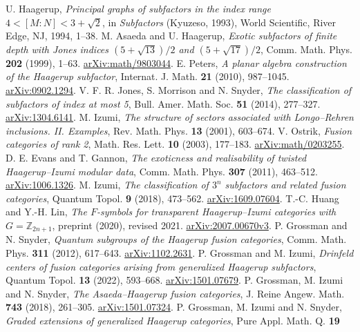 U. Haagerup, \emph{Principal graphs of subfactors in the index range
$4<[M:N]<3+\sqrt2$}, in \emph{Subfactors} (Kyuzeso, 1993), World
Scientific, River Edge, NJ, 1994, 1--38.
M. Asaeda and U. Haagerup, \emph{Exotic subfactors of finite depth with
Jones indices $(5+\sqrt{13})/2$ and $(5+\sqrt{17})/2$}, Comm. Math.
Phys. \textbf{202} (1999), 1--63.
\href{https://arxiv.org/abs/math/9803044}{arXiv:math/9803044}.
E. Peters, \emph{A planar algebra construction of the Haagerup
subfactor}, Internat. J. Math. \textbf{21} (2010), 987--1045.
\href{https://arxiv.org/abs/0902.1294}{arXiv:0902.1294}.
V. F. R. Jones, S. Morrison and N. Snyder, \emph{The classification of
subfactors of index at most 5}, Bull. Amer. Math. Soc. \textbf{51}
(2014), 277--327.
\href{https://arxiv.org/abs/1304.6141}{arXiv:1304.6141}.
M. Izumi, \emph{The structure of sectors associated with Longo--Rehren
inclusions. II. Examples}, Rev. Math. Phys. \textbf{13} (2001), 603--674.
V. Ostrik, \emph{Fusion categories of rank 2}, Math. Res. Lett.
\textbf{10} (2003), 177--183.
\href{https://arxiv.org/abs/math/0203255}{arXiv:math/0203255}.
D. E. Evans and T. Gannon, \emph{The exoticness and realisability of
twisted Haagerup--Izumi modular data}, Comm. Math. Phys. \textbf{307}
(2011), 463--512.
\href{https://arxiv.org/abs/1006.1326}{arXiv:1006.1326}.
M. Izumi, \emph{The classification of $3^n$ subfactors and related
fusion categories}, Quantum Topol. \textbf{9} (2018), 473--562.
\href{https://arxiv.org/abs/1609.07604}{arXiv:1609.07604}.
T.-C. Huang and Y.-H. Lin, \emph{The $F$-symbols for transparent
Haagerup--Izumi categories with $G=\mathbb Z_{2n+1}$}, preprint (2020),
revised 2021.
\href{https://arxiv.org/abs/2007.00670v3}{arXiv:2007.00670v3}.
P. Grossman and N. Snyder, \emph{Quantum subgroups of the Haagerup
fusion categories}, Comm. Math. Phys. \textbf{311} (2012), 617--643.
\href{https://arxiv.org/abs/1102.2631}{arXiv:1102.2631}.
P. Grossman and M. Izumi, \emph{Drinfeld centers of fusion categories
arising from generalized Haagerup subfactors}, Quantum Topol.
\textbf{13} (2022), 593--668.
\href{https://arxiv.org/abs/1501.07679}{arXiv:1501.07679}.
P. Grossman, M. Izumi and N. Snyder, \emph{The Asaeda--Haagerup fusion
categories}, J. Reine Angew. Math. \textbf{743} (2018), 261--305.
\href{https://arxiv.org/abs/1501.07324}{arXiv:1501.07324}.
P. Grossman, M. Izumi and N. Snyder, \emph{Graded extensions of
generalized Haagerup categories}, Pure Appl. Math. Q. \textbf{19}
